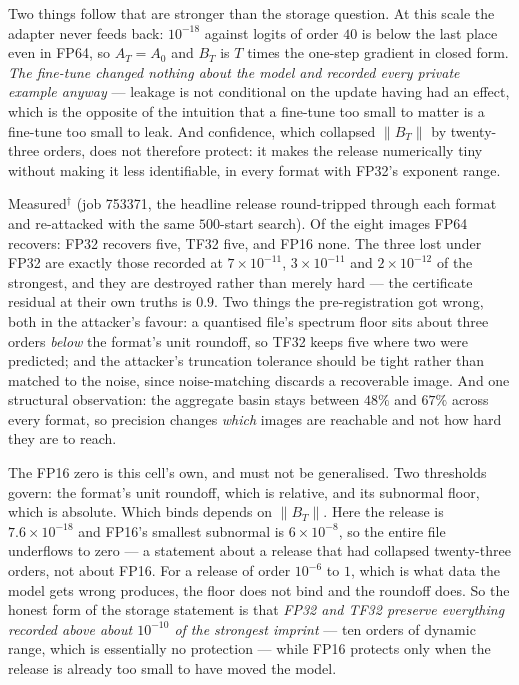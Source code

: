 Two things follow that are stronger than the storage question. At this scale
the adapter never feeds back: $10^{-18}$ against logits of order $40$ is below
the last place even in FP64, so $A_T=A_0$ and $B_T$ is $T$ times the one-step
gradient in closed form. \emph{The fine-tune changed nothing about the model
and recorded every private example anyway} --- leakage is not conditional on
the update having had an effect, which is the opposite of the intuition that a
fine-tune too small to matter is a fine-tune too small to leak. And
confidence, which collapsed $\|B_T\|$ by twenty-three orders, does not
therefore protect: it makes the release numerically tiny without making it
less identifiable, in every format with FP32's exponent range.

Measured$^\dagger$ (job 753371, the headline release round-tripped through
each format and re-attacked with the same $500$-start search). Of the eight
images FP64 recovers: FP32 recovers five, TF32 five, and FP16 none. The three
lost under FP32 are exactly those recorded at $7\times10^{-11}$,
$3\times10^{-11}$ and $2\times10^{-12}$ of the strongest, and they are
destroyed rather than merely hard --- the certificate residual at their own
truths is $0.9$. Two things the pre-registration got wrong, both in the
attacker's favour: a quantised file's spectrum floor sits about three orders
\emph{below} the format's unit roundoff, so TF32 keeps five where two were
predicted; and the attacker's truncation tolerance should be tight rather than
matched to the noise, since noise-matching discards a recoverable image. And
one structural observation: the aggregate basin stays between $48\%$ and
$67\%$ across every format, so precision changes \emph{which} images are
reachable and not how hard they are to reach.

The FP16 zero is this cell's own, and must not be generalised. Two thresholds
govern: the format's unit roundoff, which is relative, and its subnormal
floor, which is absolute. Which binds depends on $\|B_T\|$. Here the release
is $7.6\times10^{-18}$ and FP16's smallest subnormal is $6\times10^{-8}$, so
the entire file underflows to zero --- a statement about a release that had
collapsed twenty-three orders, not about FP16. For a release of order
$10^{-6}$ to $1$, which is what data the model gets wrong produces, the floor
does not bind and the roundoff does. So the honest form of the storage
statement is that \emph{FP32 and TF32 preserve everything recorded above about
$10^{-10}$ of the strongest imprint} --- ten orders of dynamic range, which is
essentially no protection --- while FP16 protects only when the release is
already too small to have moved the model.

